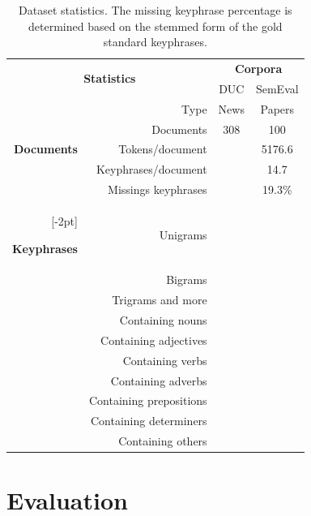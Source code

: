  \begin{table}[h]
    \centering
    \begin{tabular}{@{~}r@{~~}r@{~~}c@{~~}c@{~}}
      \toprule
      \multicolumn{2}{c}{\multirow{2}{*}[-2pt]{\textbf{Statistics}}} & \multicolumn{2}{c}{\textbf{Corpora}}\\
      \cmidrule{3-4}
      & & DUC & SemEval\\
      \midrule
      \multirow{5}{*}[-2pt]{\begin{sideways}\textbf{Documents}\end{sideways}} & Type & News & Papers\\
      & Documents & 308 & 100\\
      & Tokens/document & & 5176.6\\
      & Keyphrases/document & & 14.7\\
      & Missings keyphrases & & 19.3\%\\
      \addlinespace[\defaultaddspace]
      \multirow{10}{*}[-2pt]{\begin{sideways}\textbf{Keyphrases}\end{sideways}} & Unigrams & & \\
      & Bigrams & & \\
      & Trigrams and more & & \\
      & Containing nouns & & \\
      & Containing adjectives & & \\
      & Containing verbs & & \\
      & Containing adverbs & & \\
      & Containing prepositions & & \\
      & Containing determiners & & \\
      & Containing others & & \\
      \bottomrule
    \end{tabular}
    \caption{Dataset statistics. The missing keyphrase percentage is determined
             based on the stemmed form of the gold standard keyphrases.
             \label{tab:dataset_statistics}}
  \end{table}


\section{Evaluation}
\label{sec:evaluation}

